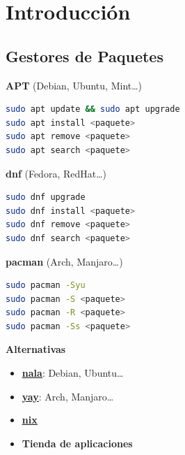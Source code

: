 \documentclass[aspectratio=43]{beamer}
\begin{document}
    \section{Introducción}
    \subsection{Gestores de Paquetes}
     \begin{frame}[fragile]{\subsecname}{}
        \begin{multicols}{2}
            \textbf{APT} (Debian, Ubuntu, Mint\ldots)\\
            \begin{lstlisting}[language=bash]
sudo apt update && sudo apt upgrade
sudo apt install <paquete>
sudo apt remove <paquete>
sudo apt search <paquete>\end{lstlisting}
            \textbf{dnf} (Fedora, RedHat\ldots)\\
            \begin{lstlisting}[language=bash]
sudo dnf upgrade
sudo dnf install <paquete>
sudo dnf remove <paquete>
sudo dnf search <paquete>\end{lstlisting}
            \newpage
            \textbf{pacman} (Arch, Manjaro\ldots)\\
            \begin{lstlisting}[language=bash]
sudo pacman -Syu
sudo pacman -S <paquete>
sudo pacman -R <paquete>
sudo pacman -Ss <paquete>\end{lstlisting}
            \textbf{Alternativas}
            \begin{itemize}
                \item \href{https://gitlab.com/volian/nala}{\underline{\textbf{nala}}}: Debian, Ubuntu\ldots
                \item \href{https://github.com/Jguer/yay}{\underline{\textbf{yay}}}: Arch, Manjaro\ldots
                \item \href{https://github.com/NixOS/nix}{\underline{\textbf{nix}}}
                \item \textbf{Tienda de aplicaciones}
            \end{itemize}
        \end{multicols}
    \end{frame}
\end{document}
